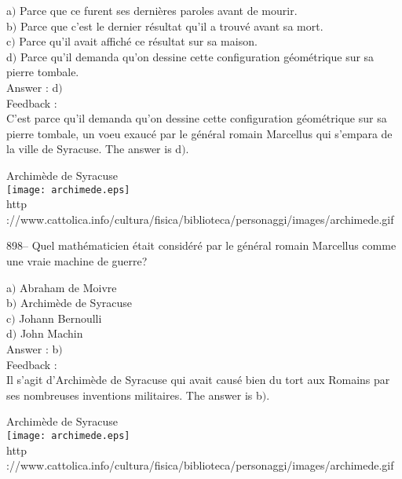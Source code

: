 \documentclass[letterpaper, 12pt]{article}
\begin{document}
a$)$ Parce que ce furent ses derni\`eres paroles avant de mourir. \\
b$)$ Parce que c'est le dernier r\'esultat qu'il a trouv\'e avant sa mort.
\\
c$)$ Parce qu'il avait affich\'e ce r\'esultat sur sa maison. \\
d$)$ Parce qu'il demanda qu'on dessine cette configuration g\'eom\'etrique
sur sa pierre tombale.\\

Answer : d$)$\\

Feedback : \\
C'est parce qu'il demanda qu'on dessine cette configuration g\'eom\'etrique
sur sa pierre tombale,
un voeu exauc\'e par le g\'en\'eral romain Marcellus qui s'empara de la
ville de Syracuse. The answer is d$)$.\\

        \begin{center}
        Archim\`ede de Syracuse\\
    \texttt{[image: archimede.eps]}\\
        {\footnotesize http
://www.cattolica.info/cultura/fisica/biblioteca/personaggi/images/archimede.gif}
    \end{center}

898-- Quel math\'ematicien \'etait consid\'er\'e par le g\'en\'eral
romain Marcellus comme une vraie machine de guerre?

a$)$ Abraham de Moivre \\
b$)$ Archim\`ede de Syracuse \\
c$)$ Johann Bernoulli \\
d$)$ John Machin \\

Answer : b$)$\\

Feedback :\\
Il s'agit d'Archim\`ede de Syracuse qui avait caus\'e bien du tort
aux Romains par ses nombreuses inventions
militaires. The answer is b$)$.\\

        \begin{center}
        Archim\`ede de Syracuse\\
    \texttt{[image: archimede.eps]}\\
        {\footnotesize http
://www.cattolica.info/cultura/fisica/biblioteca/personaggi/images/archimede.gif}
    \end{center}
\end{document}
